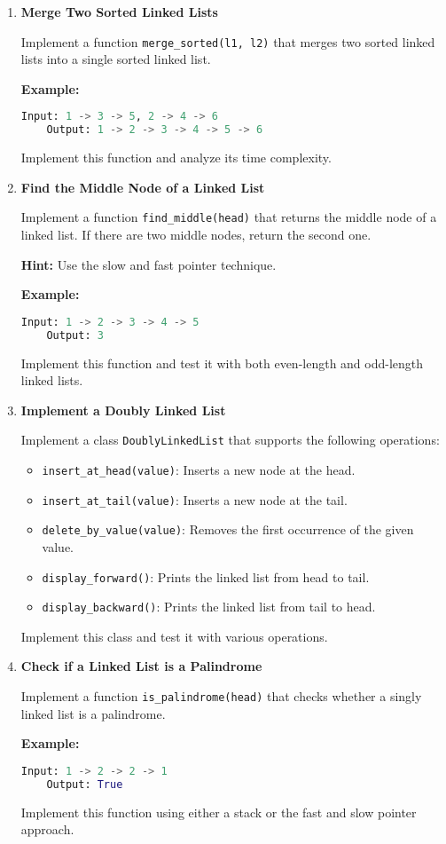 \documentclass{article}
\begin{document}
\begin{enumerate}
    \item \textbf{Merge Two Sorted Linked Lists}
    
    Implement a function \texttt{merge\_sorted(l1, l2)} that merges two sorted linked lists into a single sorted linked list.
    
    \textbf{Example:}
    \begin{lstlisting}[language=Python]
    Input: 1 -> 3 -> 5, 2 -> 4 -> 6
    Output: 1 -> 2 -> 3 -> 4 -> 5 -> 6
    \end{lstlisting}
    Implement this function and analyze its time complexity.
    
    \item \textbf{Find the Middle Node of a Linked List}
    
    Implement a function \texttt{find\_middle(head)} that returns the middle node of a linked list. If there are two middle nodes, return the second one.
    
    \textbf{Hint:} Use the slow and fast pointer technique.
    
    \textbf{Example:}
    \begin{lstlisting}[language=Python]
    Input: 1 -> 2 -> 3 -> 4 -> 5
    Output: 3
    \end{lstlisting}
    Implement this function and test it with both even-length and odd-length linked lists.
    
    \item \textbf{Implement a Doubly Linked List}
    
    Implement a class \texttt{DoublyLinkedList} that supports the following operations:
    \begin{itemize}
        \item \texttt{insert\_at\_head(value)}: Inserts a new node at the head.
        \item \texttt{insert\_at\_tail(value)}: Inserts a new node at the tail.
        \item \texttt{delete\_by\_value(value)}: Removes the first occurrence of the given value.
        \item \texttt{display\_forward()}: Prints the linked list from head to tail.
        \item \texttt{display\_backward()}: Prints the linked list from tail to head.
    \end{itemize}
    Implement this class and test it with various operations.
    
    \item \textbf{Check if a Linked List is a Palindrome}
    
    Implement a function \texttt{is\_palindrome(head)} that checks whether a singly linked list is a palindrome.
    
    \textbf{Example:}
    \begin{lstlisting}[language=Python]
    Input: 1 -> 2 -> 2 -> 1
    Output: True
    \end{lstlisting}
    Implement this function using either a stack or the fast and slow pointer approach.

\end{enumerate}
\end{document}
